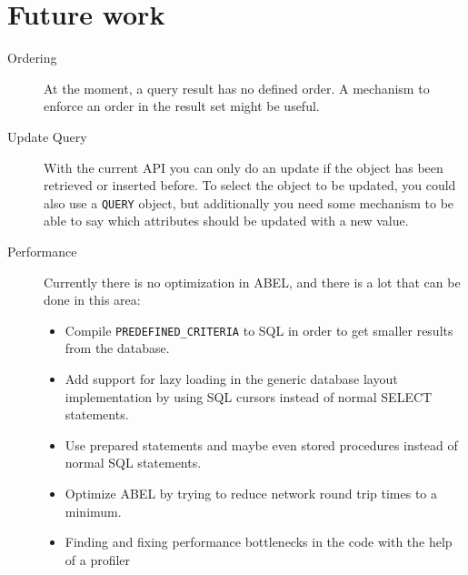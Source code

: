 \section{Future work}
\begin{description}
 \item [Ordering] At the moment, a query result has no defined order. A mechanism to enforce an order in the result set might be useful.
 \item [Update Query] With the current API you can only do an update if the object has been retrieved or inserted before. 
To select the object to be updated, you could also use a \lstinline!QUERY! object, but additionally you need some mechanism to be able to say which attributes should be updated with a new value.
 \item [Performance] Currently there is no optimization in ABEL, and there is a lot that can be done in this area:
 \begin{itemize}
  \item Compile \lstinline!PREDEFINED_CRITERIA! to SQL in order to get smaller results from the database.
 \item Add support for lazy loading in the generic database layout implementation by using SQL cursors instead of normal SELECT statements.
 \item Use prepared statements and maybe even stored procedures instead of normal SQL statements.
 \item Optimize ABEL by trying to reduce network round trip times to a minimum.
 \item Finding and fixing performance bottlenecks in the code with the help of a profiler
\end{itemize}


\end{description}
